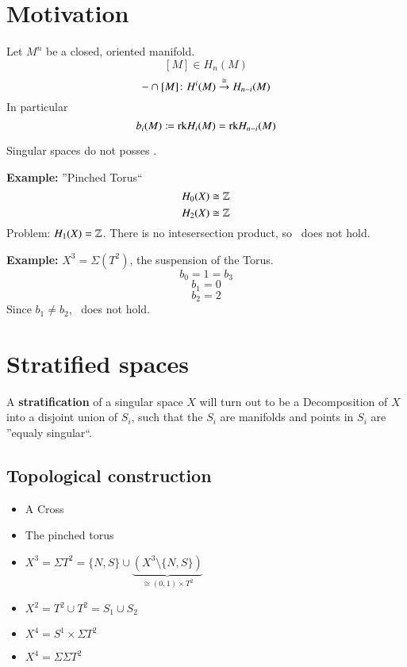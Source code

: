 \newcommand{\doctitle}{Stratified singular spaces and poincarè-duality by Markus Banagl - 12.04.11}


\section*{Motivation}

\begin{satz}
    Let $M^n$ be a closed, oriented manifold.
    \[ [M] \in H_n(M) \]
    \[ -\cap [M]\colon H^i(M) \stackrel{\cong}{\to} H_{n-i}(M) \]
    In particular
    \[ b_i(M) \coloneqq \mathrm{rk} H_i(M) = \mathrm{rk} H_{n-i}(M) \]
\end{satz}

Singular spaces do not posses \PD.

\textbf{Example:} ”Pinched Torus“ %
\[ H_0(X) \cong \mathbb{Z} \]
\[ H_2(X) \cong \mathbb{Z} \]
Problem: $H_1(X) = \mathbb{Z}$. There is no intesersection product, so \PD\ does not hold.

\textbf{Example:} $X^3 = \Sigma(T^2)$, the suspension of the Torus. %
\[ b_0 = 1 = b_3 \]
\[ b_1 = 0 \]
\[ b_2 = 2 \]
Since $b_1 \neq b_2$, \PD\ does not hold.

\section*{Stratified spaces}

A \textbf{stratification} of a singular space $X$ will turn out to be a Decomposition of $X$ into a disjoint union of $S_i$, such that the $S_i$ are manifolds and points in $S_i$ are ”equaly singular“.

\subsection*{Topological construction}

\begin{itemize}
    \item A Cross
    \item The pinched torus %
    \item $X^3 = \Sigma T^2 = \{N,S\} \cup \underbrace{\left(X^3 \setminus \{N,S\}\right)}_{\cong (0,1) \times T^2}$
    \item $X^2 = T^2 \cup T^2 = S_1 \cup S_2$ %
    \item $X^4 = S^1 \times \Sigma T^2$
    \item $X^4 = \Sigma\Sigma T^2$ %
\end{itemize}

